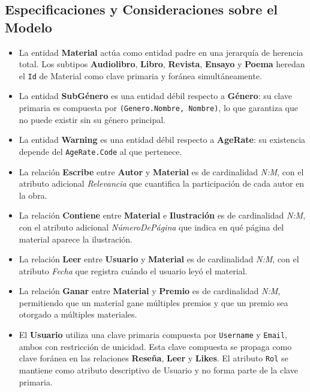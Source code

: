 \documentclass[12pt,a4paper]{article}
\begin{document}
\subsection{Especificaciones y Consideraciones sobre el Modelo}

\begin{itemize}
    \item La entidad \textbf{Material} actúa como entidad padre en una jerarquía de herencia total. Los subtipos \textbf{Audiolibro}, \textbf{Libro}, \textbf{Revista}, \textbf{Ensayo} y \textbf{Poema} heredan el \texttt{Id} de Material como clave primaria y foránea simultáneamente.

    \item La entidad \textbf{SubGénero} es una entidad débil respecto a \textbf{Género}: su clave primaria es compuesta por \texttt{(Genero.Nombre, Nombre)}, lo que garantiza que no puede existir sin su género principal.

    \item La entidad \textbf{Warning} es una entidad débil respecto a \textbf{AgeRate}: su existencia depende del \texttt{AgeRate.Code} al que pertenece.

    \item La relación \textbf{Escribe} entre \textbf{Autor} y \textbf{Material} es de cardinalidad \textit{N:M}, con el atributo adicional \textit{Relevancia} que cuantifica la participación de cada autor en la obra.

    \item La relación \textbf{Contiene} entre \textbf{Material} e \textbf{Ilustración} es de cardinalidad \textit{N:M}, con el atributo adicional \textit{NúmeroDePágina} que indica en qué página del material aparece la ilustración.

    \item La relación \textbf{Leer} entre \textbf{Usuario} y \textbf{Material} es de cardinalidad \textit{N:M}, con el atributo \textit{Fecha} que registra cuándo el usuario leyó el material.

    \item La relación \textbf{Ganar} entre \textbf{Material} y \textbf{Premio} es de cardinalidad \textit{N:M}, permitiendo que un material gane múltiples premios y que un premio sea otorgado a múltiples materiales.

    \item El \textbf{Usuario} utiliza una clave primaria compuesta por \texttt{Username} y \texttt{Email}, ambos con restricción de unicidad. Esta clave compuesta se propaga como clave foránea en las relaciones \textbf{Reseña}, \textbf{Leer} y \textbf{Likes}. El atributo \texttt{Rol} se mantiene como atributo descriptivo de Usuario y no forma parte de la clave primaria.


\end{itemize}
\end{document}
